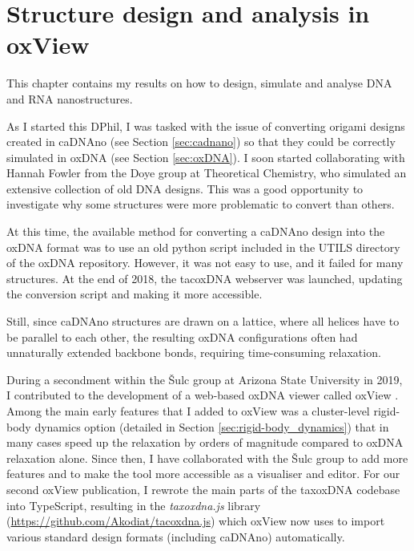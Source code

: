 \chapter{\label{ch:oxview}Structure design and analysis in oxView}

\minitoc

This chapter contains my results on how to design, simulate and analyse DNA and RNA nanostructures. 


As I started this DPhil, I was tasked with the issue of converting origami designs created in caDNAno (see Section \ref{sec:cadnano}) so that they could be correctly simulated in oxDNA (see Section \ref{sec:oxDNA}). I soon started collaborating with Hannah Fowler from the Doye group at Theoretical Chemistry, who simulated an extensive collection of old DNA designs. This was a good opportunity to investigate why some structures were more problematic to convert than others.

At this time, the available method for converting a caDNAno design into the oxDNA format was to use an old python script included in the UTILS directory of the oxDNA repository. However, it was not easy to use, and it failed for many structures. At the end of 2018, the tacoxDNA webserver \cite{suma2019tacoxdna} was launched, updating the conversion script and making it more accessible.

Still, since caDNAno structures are drawn on a lattice, where all helices have to be parallel to each other, the resulting oxDNA configurations often had unnaturally extended backbone bonds, requiring time-consuming relaxation.

During a secondment within the {\v{S}}ulc group at Arizona State University in 2019, I contributed to the development of a web-based oxDNA viewer called oxView \cite{poppleton2020design}. Among the main early features that I added to oxView was a cluster-level rigid-body dynamics option (detailed in Section \ref{sec:rigid-body_dynamics}) that in many cases speed up the relaxation by orders of magnitude compared to oxDNA relaxation alone. Since then, I have collaborated with the {\v{S}}ulc group to add more features and to make the tool more accessible as a visualiser and editor. For our second oxView publication, I rewrote the main parts of the taxoxDNA codebase into TypeScript, resulting in the \emph{taxoxdna.js} library (\url{https://github.com/Akodiat/tacoxdna.js}) which oxView now uses to import various standard design formats (including caDNAno) automatically.

